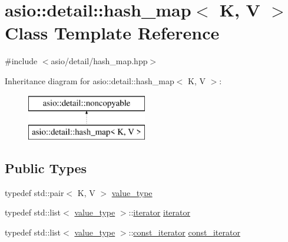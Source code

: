 \hypertarget{classasio_1_1detail_1_1hash__map}{}\section{asio\+:\+:detail\+:\+:hash\+\_\+map$<$ K, V $>$ Class Template Reference}
\label{classasio_1_1detail_1_1hash__map}


{\ttfamily \#include $<$asio/detail/hash\+\_\+map.\+hpp$>$}

Inheritance diagram for asio\+:\+:detail\+:\+:hash\+\_\+map$<$ K, V $>$\+:\begin{figure}[H]
\begin{center}
\leavevmode
\includegraphics[height=2.000000cm]{classasio_1_1detail_1_1hash__map}
\end{center}
\end{figure}
\subsection*{Public Types}
\begin{DoxyCompactItemize}
\item 
typedef std\+::pair$<$ K, V $>$ \hyperlink{classasio_1_1detail_1_1hash__map_a951382d3db34c58e0a38adccba7f084e}{value\+\_\+type}
\item 
typedef std\+::list$<$ \hyperlink{classasio_1_1detail_1_1hash__map_a951382d3db34c58e0a38adccba7f084e}{value\+\_\+type} $>$\+::\hyperlink{classasio_1_1detail_1_1hash__map_a0f24b597db0331311f431ad015e3b558}{iterator} \hyperlink{classasio_1_1detail_1_1hash__map_a0f24b597db0331311f431ad015e3b558}{iterator}
\item 
typedef std\+::list$<$ \hyperlink{classasio_1_1detail_1_1hash__map_a951382d3db34c58e0a38adccba7f084e}{value\+\_\+type} $>$\+::\hyperlink{classasio_1_1detail_1_1hash__map_ab0e2b29d40bba3e3c772850e6dbca0d5}{const\+\_\+iterator} \hyperlink{classasio_1_1detail_1_1hash__map_ab0e2b29d40bba3e3c772850e6dbca0d5}{const\+\_\+iterator}
\end{DoxyCompactItemize}
